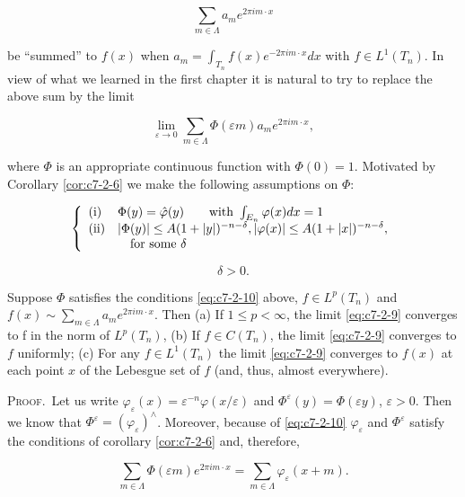 \[
\sum_{m\in\Lambda}a_{m}e^{2\pi i m\cdot x}
\]

be ``summed'' to $f(x)$ when $a_m = \int_{T_n} f(x) e^{-2\pi im \cdot x} dx$ with $f \in L^1(T_n)$. In view of what we learned in the first chapter it is natural to try to replace the above sum by the limit

\begin{equation}\label{eq:c7-2-9}
\lim_{\varepsilon\to0}\sum_{m\in\Lambda}\Phi(\varepsilon m)a_{m}e^{2\pi i m\cdot x},
\end{equation}

where $\Phi$ is an appropriate continuous function with $\Phi(0) = 1$. Motivated by Corollary \eqref{cor:c7-2-6} we make the following assumptions on $\Phi$:

\begin{equation}\label{eq:c7-2-10}
\left\{\begin{array}{l l}{\mathrm{(i)}}&{\Phi(y)=\hat{\varphi}(y)\qquad\text{with }\int_{E_{n}}\varphi(x)d x=1}\\ {\text{(ii)}}&{|\Phi(y)|\leq A(1+|y|)^{-n-\delta},|\varphi(x)|\leq A(1+|x|)^{-n-\delta},}\\ &{\quad\text{for some }\delta}\end{array}\right.
\end{equation}

\[
\delta>0.
\]

\begin{theorem}
\label{thm:c7-2-11}
Suppose $\Phi$ satisfies the conditions \eqref{eq:c7-2-10} above, $f \in L^{p}(T_{n})$ and $f(x) \sim \sum_{m \in \Lambda} a_{m} e^{2\pi i m \cdot x}$. Then
(a) If $1 \leq p < \infty$, the limit \eqref{eq:c7-2-9} converges to f in the norm of $L^p(T_n)$,
(b) If $f \in C(T_n)$, the limit \eqref{eq:c7-2-9} converges to $f$ uniformly;
(c) For any $f \in L^{1}(T_{n})$ the limit \eqref{eq:c7-2-9} converges to $f(x)$ at each point $x$ of the Lebesgue set of $f$ (and, thus, almost everywhere).
\end{theorem}

\textsc{Proof.}\ Let us write $\varphi_{\varepsilon}(x) = \varepsilon^{-n}\varphi(x/\varepsilon)$ and $\Phi^{\varepsilon}(y) = \Phi(\varepsilon y)$, $\varepsilon > 0$. Then we know that $\Phi^{\varepsilon} = (\varphi_{\varepsilon})^{\wedge}$. Moreover, because of \eqref{eq:c7-2-10} $\varphi_{\varepsilon}$ and $\Phi^{\varepsilon}$ satisfy the conditions of corollary \eqref{cor:c7-2-6} and, therefore,

\begin{equation}\label{eq:c7-2-12}
\sum_{m\in\Lambda}\Phi(\varepsilon m)e^{2\pi i m\cdot x}=\sum_{m\in\Lambda}\varphi_{\varepsilon}(x+m).
\end{equation}

